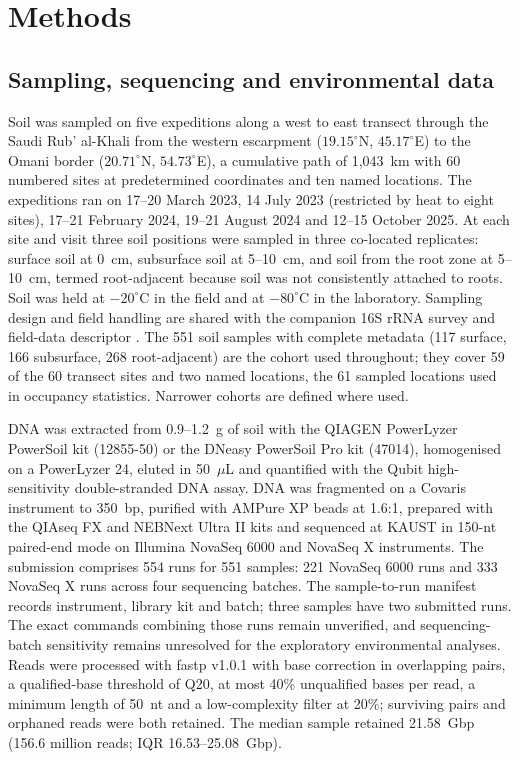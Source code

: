 \documentclass[11pt]{article}
\begin{document}
\section*{Methods}

\subsection*{Sampling, sequencing and environmental data}
Soil was sampled on five expeditions along a west to east transect through the Saudi Rub' al-Khali
from the western escarpment ($19.15^\circ$N, $45.17^\circ$E) to the Omani border ($20.71^\circ$N,
$54.73^\circ$E), a cumulative path of 1{,}043~km with 60 numbered sites at predetermined coordinates
and ten named locations. The expeditions ran on 17--20 March 2023, 14 July 2023 (restricted by heat
to eight sites), 17--21 February 2024, 19--21 August 2024 and 12--15 October 2025. At each site and
visit three soil positions were sampled in three co-located replicates: surface soil at 0~cm,
subsurface soil at 5--10~cm, and soil from the root zone at 5--10~cm, termed root-adjacent because
soil was not consistently attached to roots. Soil was held at $-20^\circ$C in the field and at
$-80^\circ$C in the laboratory. Sampling design and field handling are shared with the companion
16S rRNA survey and field-data descriptor \citep{tawfiq2026companion,rubalkhali_datapaper}. The 551 soil samples with complete metadata (117 surface, 166 subsurface, 268 root-adjacent)
are the cohort used throughout; they cover 59 of the 60 transect sites and two named locations, the
61 sampled locations used in occupancy statistics. Narrower cohorts are defined where used.

DNA was extracted from 0.9--1.2~g of soil with the QIAGEN PowerLyzer PowerSoil kit (12855-50) or the
DNeasy PowerSoil Pro kit (47014), homogenised on a PowerLyzer 24, eluted in 50~$\mu$L and quantified
with the Qubit high-sensitivity double-stranded DNA assay. DNA was fragmented on a Covaris instrument
to 350~bp, purified with AMPure XP beads at 1.6:1, prepared with the QIAseq FX and NEBNext Ultra II
kits and sequenced at KAUST in 150-nt paired-end mode on Illumina NovaSeq 6000 and NovaSeq X instruments.
The submission comprises 554 runs for 551 samples: 221 NovaSeq 6000 runs and 333 NovaSeq X runs
across four sequencing batches. The sample-to-run manifest records instrument, library kit and
batch; three samples have two submitted runs. The exact commands combining those runs remain unverified, and sequencing-batch sensitivity remains unresolved for the exploratory environmental analyses. Reads were
processed with fastp v1.0.1 \citep{chen2018fastp} with base correction in overlapping pairs, a
qualified-base threshold of Q20, at most 40\% unqualified bases per read, a minimum length of 50~nt
and a low-complexity filter at 20\%; surviving pairs and orphaned reads were both retained. The
median sample retained 21.58~Gbp (156.6 million reads; IQR 16.53--25.08~Gbp).
\end{document}
